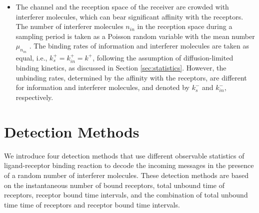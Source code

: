 \documentclass[twocolumn]{IEEEtran}
\begin{document}
\begin{itemize}
	
	
	\item The channel and the reception space of the receiver are crowded with interferer molecules, which can bear significant affinity with the receptors. The number of interferer molecules $n_{in}$ in the reception space during a sampling period is taken as a Poisson random variable with the mean number $\mu_{n_{in}}$ \cite{bialek2012biophysics}. The binding rates of information and interferer molecules are taken as equal, i.e., $k_s^+ = k_{in}^+ = k^+$, following the assumption of diffusion-limited binding kinetics, as discussed in Section \ref{sec:statistics}.  However, the unbinding rates, determined by the affinity with the receptors, are different for information and interferer molecules, and denoted by $k_s^-$ and $k_{in}^-$, respectively. 
	
	
\end{itemize}


\section{Detection Methods}
\label{sec:detection}
We introduce four detection methods that use different observable statistics of ligand-receptor binding reaction to decode the incoming messages in the presence of a random number of interferer molecules. These detection methods are based on the instantaneous number of bound receptors, total unbound time of receptors, receptor bound time intervals, and the combination of total unbound time time of receptors and receptor bound time intervals. 
\end{document}
